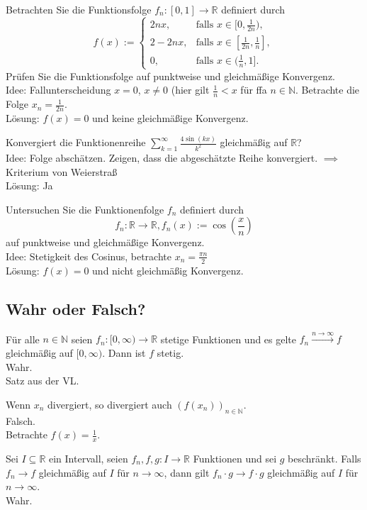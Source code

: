 Betrachten Sie die Funktionsfolge $f_n:[0,1] \to \mathbb{R}$ definiert durch
\begin{displaymath}
  f(x) := 
  \begin{cases}
    2nx,& \text{falls } x \in [0,\frac{1}{2n}),\\
    2 - 2nx,& \text{falls } x \in [\frac{1}{2n}, \frac{1}{n}],\\
    0,& \text{falls } x \in (\frac{1}{n}, 1].
  \end{cases}
\end{displaymath}
Prüfen Sie die Funktionsfolge auf punktweise und gleichmäßige Konvergenz.\\
Idee: Fallunterscheidung $x = 0$, $x \neq 0$ (hier gilt $\frac{1}{n} < x$ für ffa $n \in \mathbb{N}$.
Betrachte die Folge $x_n = \frac{1}{2n}$.\\
Lösung: $f(x) = 0$ und keine gleichmäßige Konvergenz.

Konvergiert die Funktionenreihe $\sum_{k = 1}^{\infty} \frac{4 \sin(kx)}{k^2}$ gleichmäßig auf $\mathbb{R}$?\\
Idee: Folge abschätzen. Zeigen, dass die abgeschätzte Reihe konvergiert. $\implies$ Kriterium von Weierstraß\\
Lösung: Ja

Untersuchen Sie die Funktionenfolge $f_n$ definiert durch
\begin{displaymath}
  f_n : \mathbb{R} \to \mathbb{R}, f_n(x) := \cos\left(\frac{x}{n}\right)
\end{displaymath}
auf punktweise und gleichmäßige Konvergenz.\\
Idee: Stetigkeit des Cosinus, betrachte $x_n = \frac{\pi n}{2}$\\
Lösung: $f(x) = 0$ und nicht gleichmäßig Konvergenz.

\subsection{Wahr oder Falsch?}
Für alle $n \in \mathbb{N}$ seien $f_n : [0, \infty) \to \mathbb{R}$ stetige Funktionen und es gelte $f_n \xrightarrow{n \to \infty} f$ gleichmäßig auf $[0,\infty)$. Dann ist $f$ stetig.\\
Wahr.\\
Satz aus der VL.

Wenn $x_n$ divergiert, so divergiert auch $(f(x_n))_{n \in \mathbb{N}}$.\\
Falsch.\\
Betrachte $f(x) = \frac{1}{x}$.

Sei $I \subseteq \mathbb{R}$ ein Intervall, seien $f_n, f, g : I \to \mathbb{R}$ Funktionen und sei $g$ beschränkt.
Falls $f_n \to f$ gleichmäßig auf $I$ für $n \to \infty$, dann gilt $f_n \cdot g \to f \cdot g$ gleichmäßig auf $I$ für $n \to \infty$.\\
Wahr.